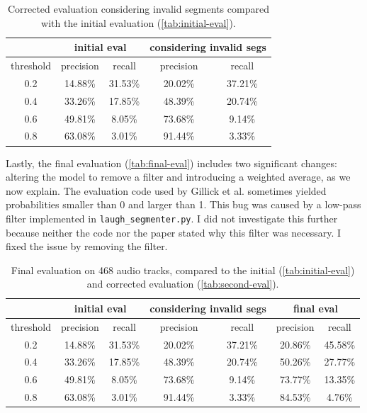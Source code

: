 \documentclass[bsc,frontabs,parskip,deptreport]{infthesis}
\begin{document}
\begin{table}[h!]
    \centering
    \begin{tabular}{|c|c|c|c|c|}
    \hline
    & \multicolumn{2}{|c|}{initial eval} & \multicolumn{2}{|c|}{considering invalid segs} \\
    \hline 
    threshold & precision & recall & precision & recall \\
    \hline
        0.2 &  14.88\% & 31.53\% & 20.02\% & 37.21\%\\ 
        0.4 &  33.26\% & 17.85\% & 48.39\% & 20.74\%\\ 
        0.6 &  49.81\% & 8.05\% & 73.68\% & 9.14\%  \\ 
        0.8 &  63.08\% & 3.01\% & 91.44\% & 3.33\%  \\ 
     \hline
    \end{tabular}
    \caption{Corrected evaluation considering invalid segments compared with the initial evaluation (\autoref{tab:initial-eval}).}
    \label{tab:second-eval}
\end{table}

Lastly, the final evaluation (\autoref{tab:final-eval}) includes two significant changes: altering the model to remove a filter and introducing a weighted average, as we now explain. 
The evaluation code used by Gillick et al. sometimes yielded probabilities smaller than 0 and larger than 1. 
This bug was caused by a low-pass filter implemented in \verb|laugh_segmenter.py|. I did not investigate this further because neither the code nor the paper stated why this filter was necessary. I fixed the issue by removing the filter.

\begin{table}[h!]
    \centering
    \begin{tabular}{|c|c|c|c|c|c|c|}
    \hline
    & \multicolumn{2}{|c|}{initial eval} & \multicolumn{2}{|c|}{considering invalid segs} & \multicolumn{2}{|c|}{final eval}  \\
    \hline 
    threshold & precision & recall & precision & recall & precision & recall  \\
    \hline
        0.2 &  14.88\% & 31.53\% & 20.02\% & 37.21\%  & 20.86\% & 45.58\%\\
        0.4 &  33.26\% & 17.85\% & 48.39\% & 20.74\%  & 50.26\% & 27.77\%\\
        0.6 &  49.81\% & 8.05\% & 73.68\% & 9.14\%    & 73.77\% & 13.35\% \\
        0.8 &  63.08\% & 3.01\% & 91.44\% & 3.33\%    & 84.53\% & 4.76\% \\
     \hline
    \end{tabular}
    \caption{Final evaluation on 468 audio tracks, compared to the initial (\autoref{tab:initial-eval}) and corrected evaluation (\autoref{tab:second-eval}).}
    \label{tab:final-eval}
\end{table}
\end{document}
